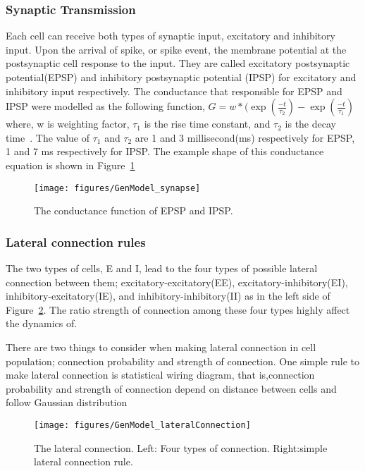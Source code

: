 \subsubsection{Synaptic Transmission}
Each cell can receive both types of synaptic input, excitatory  and inhibitory input. Upon the arrival of spike, or spike event, the membrane potential at the postsynaptic cell response to the input. They are called excitatory postsynaptic potential(EPSP) and inhibitory postsynaptic potential (IPSP) for excitatory and inhibitory input respectively. 
The conductance that responsible for EPSP and IPSP were modelled as the following function,
$G = w*(\exp(\frac{-t}{\tau_2} ) - \exp(\frac{-t}{\tau_1})$
where, w is weighting factor, $\tau_1$ is the rise time constant, and $\tau_2$ is the decay time~\cite {carnevale2006neuron}.
The value of $\tau_1$ and $\tau_2$  are 1 and 3 millisecond(ms) respectively for EPSP, 1 and 7 ms respectively for IPSP. The example shape of this conductance equation is shown in Figure~\ref{fig:GenModel_synapse}

\begin{figure}
	\centering
	\texttt{[image: figures/GenModel\_synapse]}
	\caption{The conductance function of EPSP and IPSP.}
	\label{fig:GenModel_synapse}
\end{figure}

\subsubsection{Lateral connection rules}
The two types of cells, E and I, lead to the four types of possible lateral connection between them; excitatory-excitatory(EE), excitatory-inhibitory(EI), inhibitory-excitatory(IE), and inhibitory-inhibitory(II) as in the left side of Figure~\ref{fig:GM_lateral}. The ratio strength of connection among these four types highly affect the dynamics of.

There are two things to consider when making lateral connection in cell population; connection probability and  strength of connection. One simple rule to make lateral connection is statistical wiring diagram, that is,connection probability and  strength of connection depend on distance between cells and follow Gaussian distribution~\cite{ringach2004haphazard,mclaughlin2000neuronal}

\begin{figure}
	\centering
	\texttt{[image: figures/GenModel\_lateralConnection]}
	\caption{The lateral connection. Left: Four types of connection. Right:simple lateral connection rule.}
	\label{fig:GM_lateral}
\end{figure}

